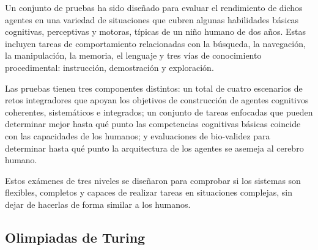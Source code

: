 Un conjunto de pruebas ha sido diseñado para evaluar el rendimiento de dichos agentes en una variedad de situaciones que cubren algunas habilidades básicas cognitivas, perceptivas y motoras, típicas de un niño humano de dos años. Estas incluyen tareas de comportamiento relacionadas con la búsqueda, la navegación, la manipulación, la memoria, el lenguaje y tres vías de conocimiento procedimental: instrucción, demostración y exploración.

Las pruebas tienen tres componentes distintos: un total de cuatro escenarios de retos integradores que apoyan los objetivos de construcción de agentes cognitivos coherentes, sistemáticos e integrados; un conjunto de tareas enfocadas que pueden determinar mejor hasta qué punto las competencias cognitivas básicas coincide con las capacidades de los humanos; y evaluaciones de bio-validez para determinar hasta qué punto la arquitectura de los agentes se asemeja al cerebro humano.
 
Estos exámenes de tres niveles se diseñaron para comprobar si los sistemas son flexibles, completos y capaces de realizar tareas en situaciones complejas, sin dejar de hacerlas de forma similar a los humanos.

\subsection{Olimpiadas de Turing}

